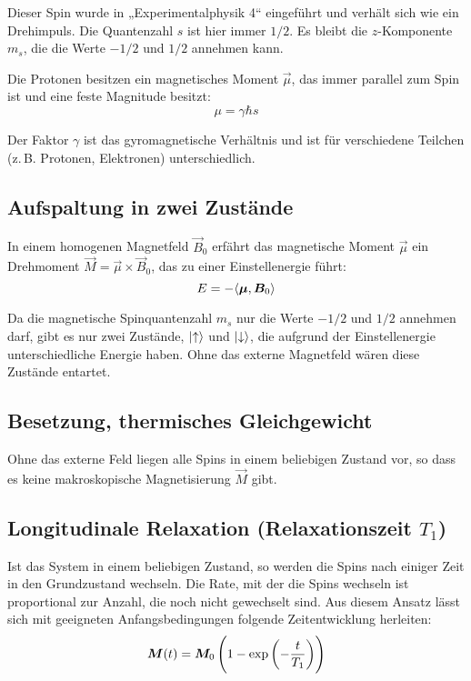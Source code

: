 Dieser Spin wurde in „Experimentalphysik 4“ eingeführt und verhält sich wie ein
Drehimpuls. Die Quantenzahl $s$ ist hier immer $1/2$. Es bleibt die
$z$-Komponente $m_s$, die die Werte $-1/2$ und $1/2$ annehmen kann.

Die Protonen besitzen ein magnetisches Moment $\vec\mu$, das immer parallel zum
Spin ist und eine feste Magnitude besitzt:
\[
    \mu = \gamma \hbar s
\]

Der Faktor $\gamma$ ist das gyromagnetische Verhältnis und ist für verschiedene
Teilchen (z.\,B. Protonen, Elektronen) unterschiedlich.

\subsection{Aufspaltung in zwei Zustände}

In einem homogenen Magnetfeld $\vec B_0$ erfährt das magnetische Moment
$\vec\mu$ ein Drehmoment $\vec M = \vec \mu \times \vec B_0$, das zu einer
Einstellenergie führt:
\[
    E = - \langle \boldsymbol{\mu}, \boldsymbol{B}_0 \rangle
\]

Da die magnetische Spinquantenzahl $m_s$ nur die Werte $-1/2$ und $1/2$ annehmen
darf, gibt es nur zwei Zustände, $\ket\uparrow$ und $\ket\downarrow$, die
aufgrund der Einstellenergie unterschiedliche Energie haben. Ohne das externe
Magnetfeld wären diese Zustände entartet.

\subsection{Besetzung, thermisches Gleichgewicht}

Ohne das externe Feld liegen alle Spins in einem beliebigen Zustand vor, so
dass es keine makroskopische Magnetisierung $\vec M$ gibt.

\subsection{Longitudinale Relaxation (Relaxationszeit $T_1$)}

Ist das System in einem beliebigen Zustand, so werden die Spins nach einiger
Zeit in den Grundzustand wechseln. Die Rate, mit der die Spins wechseln ist
proportional zur Anzahl, die noch nicht gewechselt sind. Aus diesem Ansatz
lässt sich mit geeigneten Anfangsbedingungen folgende Zeitentwicklung
herleiten:
\begin{equation}
    \label{eq:}
    \vec M(t) = \vec M_0 \del{1 - \exp\del{- \frac{t}{T_1}}}
\end{equation}


